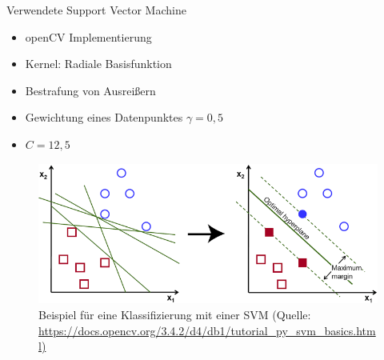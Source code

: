 \begin{frame}[t,fragile]{Verwendete Support Vector Machine}
	\begin{itemize}
		\item openCV Implementierung
 		\item Kernel: Radiale Basisfunktion
		\item Bestrafung von Ausreißern
		\item Gewichtung eines Datenpunktes $\gamma = 0,5$
		\item $C = 12,5$
  	\end{itemize}
	\begin{figure}
		\centering
		\includegraphics[scale=1]{img/SVM.png}
		\caption{Beispiel für eine Klassifizierung mit einer SVM (Quelle: \url{https://docs.opencv.org/3.4.2/d4/db1/tutorial_py_svm_basics.html)}}
	\end{figure}
\end{frame}

